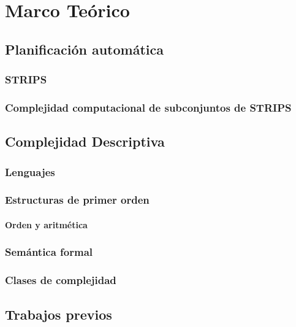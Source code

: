 
\chapter{Marco Teórico}
\label{Chapter1}

\section{Planificación automática}
\subsection{STRIPS}
\subsection{Complejidad computacional de subconjuntos de STRIPS}

\section{Complejidad Descriptiva}
\subsection{Lenguajes}
\subsection{Estructuras de primer orden}
\subsubsection{Orden y aritmética}
\subsection{Semántica formal}
\subsection{Clases de complejidad}

\section{Trabajos previos}

